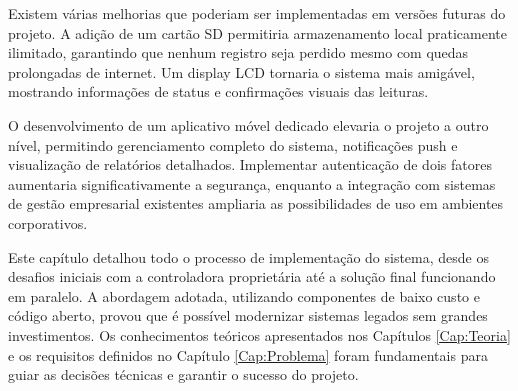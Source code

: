 Existem várias melhorias que poderiam ser implementadas em versões futuras do projeto. A adição de um cartão SD permitiria armazenamento local praticamente ilimitado, garantindo que nenhum registro seja perdido mesmo com quedas prolongadas de internet. Um display LCD tornaria o sistema mais amigável, mostrando informações de status e confirmações visuais das leituras.

O desenvolvimento de um aplicativo móvel dedicado elevaria o projeto a outro nível, permitindo gerenciamento completo do sistema, notificações push e visualização de relatórios detalhados. Implementar autenticação de dois fatores aumentaria significativamente a segurança, enquanto a integração com sistemas de gestão empresarial existentes ampliaria as possibilidades de uso em ambientes corporativos.

Este capítulo detalhou todo o processo de implementação do sistema, desde os desafios iniciais com a controladora proprietária até a solução final funcionando em paralelo. A abordagem adotada, utilizando componentes de baixo custo e código aberto, provou que é possível modernizar sistemas legados sem grandes investimentos. Os conhecimentos teóricos apresentados nos Capítulos \ref{Cap:Teoria} e os requisitos definidos no Capítulo \ref{Cap:Problema} foram fundamentais para guiar as decisões técnicas e garantir o sucesso do projeto.
